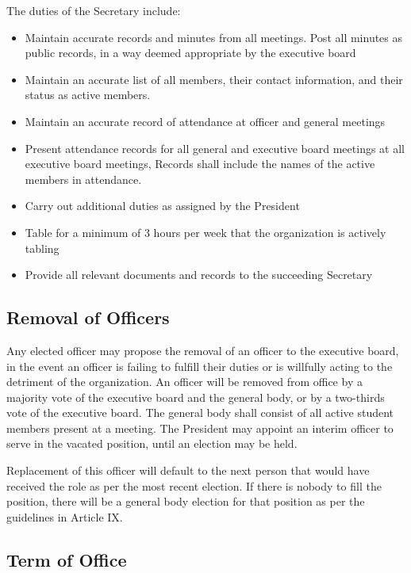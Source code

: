 \documentclass{article}
\begin{document}
\noindent
The duties of the Secretary include:

\begin{itemize}
    \item Maintain accurate records and minutes from all meetings. Post all minutes as public records, in a way deemed appropriate by the executive board
    \item Maintain an accurate list of all members, their contact information, and their status as active members.
    \item Maintain an accurate record of attendance at officer and general meetings
    \item Present attendance records for all general and executive board meetings at all executive board meetings, Records shall include the names of the active members in attendance.
    \item Carry out additional duties as assigned by the President
    \item Table for a minimum of 3 hours per week that the organization is actively tabling
    \item Provide all relevant documents and records to the succeeding Secretary
\end{itemize}

\subsection{Removal of Officers}

Any elected officer may propose the removal of an officer to the executive board, in the event an officer is failing to fulfill their duties or is willfully acting to the detriment of the organization. An officer will be removed from office by a majority vote of the executive board and the general body, or by a two-thirds vote of the executive board. The general body shall consist of all active student members present at a meeting. The President may appoint an interim officer to serve in the vacated position, until an election may be held.

Replacement of this officer will default to the next person that would have received the role as per the most recent election. If there is nobody to fill the position, there will be a general body election for that position as per the guidelines in Article IX.

\subsection{Term of Office}
\end{document}
